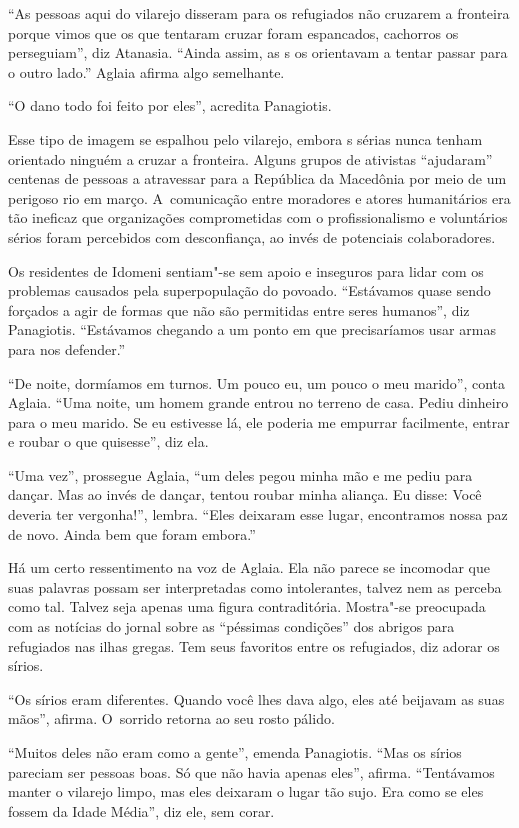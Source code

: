 ``As pessoas aqui do vilarejo disseram para os refugiados não cruzarem a
fronteira porque vimos que os que tentaram cruzar foram espancados,
cachorros os perseguiam'', diz Atanasia. ``Ainda assim, as s os
orientavam a tentar passar para o outro lado.'' Aglaia afirma algo
semelhante.

``O dano todo foi feito por eles'', acredita Panagiotis.

Esse tipo de imagem se espalhou pelo vilarejo, embora s sérias nunca
tenham orientado ninguém a cruzar a fronteira. Alguns grupos de
ativistas ``ajudaram'' centenas de pessoas a atravessar para a República
da Macedônia por meio de um perigoso rio em março. A~comunicação entre
moradores e atores humanitários era tão ineficaz que organizações
comprometidas com o profissionalismo e voluntários sérios foram
percebidos com desconfiança, ao invés de potenciais colaboradores.

Os residentes de Idomeni sentiam"-se sem apoio e inseguros para lidar com
os problemas causados pela superpopulação do povoado. ``Estávamos quase
sendo forçados a agir de formas que não são permitidas entre seres
humanos'', diz Panagiotis. ``Estávamos chegando a um ponto em que
precisaríamos usar armas para nos defender.''

``De noite, dormíamos em turnos. Um pouco eu, um pouco o meu marido'',
conta Aglaia. ``Uma noite, um homem grande entrou no terreno de casa.
Pediu dinheiro para o meu marido. Se eu estivesse lá, ele poderia me
empurrar facilmente, entrar e roubar o que quisesse'', diz ela.

``Uma vez'', prossegue Aglaia, ``um deles pegou minha mão e me pediu
para dançar. Mas ao invés de dançar, tentou roubar minha aliança. Eu
disse: Você deveria ter vergonha!'', lembra. ``Eles deixaram esse lugar,
encontramos nossa paz de novo. Ainda bem que foram embora.''

Há um certo ressentimento na voz de Aglaia. Ela não parece se incomodar
que suas palavras possam ser interpretadas como intolerantes, talvez nem
as perceba como tal. Talvez seja apenas uma figura contraditória.
Mostra"-se preocupada com as notícias do jornal sobre as ``péssimas
condições'' dos abrigos para refugiados nas ilhas gregas. Tem seus
favoritos entre os refugiados, diz adorar os sírios.

``Os sírios eram diferentes. Quando você lhes dava algo, eles até
beijavam as suas mãos'', afirma. O~sorrido retorna ao seu rosto pálido.

``Muitos deles não eram como a gente'', emenda Panagiotis. ``Mas os
sírios pareciam ser pessoas boas. Só que não havia apenas eles'',
afirma. ``Tentávamos manter o vilarejo limpo, mas eles deixaram o lugar
tão sujo. Era como se eles fossem da Idade Média'', diz ele, sem corar.

